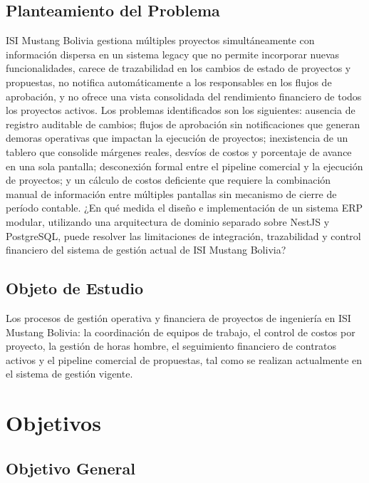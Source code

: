 \documentclass{univalle-perfil}
\begin{document}
\subsection{Planteamiento del Problema}

ISI Mustang Bolivia gestiona múltiples proyectos simultáneamente con información dispersa en un sistema legacy que no permite incorporar nuevas funcionalidades, carece de trazabilidad en los cambios de estado de proyectos y propuestas, no notifica automáticamente a los responsables en los flujos de aprobación, y no ofrece una vista consolidada del rendimiento financiero de todos los proyectos activos. Los problemas identificados son los siguientes: ausencia de registro auditable de cambios; flujos de aprobación sin notificaciones que generan demoras operativas que impactan la ejecución de proyectos; inexistencia de un tablero que consolide márgenes reales, desvíos de costos y porcentaje de avance en una sola pantalla; desconexión formal entre el pipeline comercial y la ejecución de proyectos; y un cálculo de costos deficiente que requiere la combinación manual de información entre múltiples pantallas sin mecanismo de cierre de período contable. ¿En qué medida el diseño e implementación de un sistema ERP modular, utilizando una arquitectura de dominio separado sobre NestJS y PostgreSQL, puede resolver las limitaciones de integración, trazabilidad y control financiero del sistema de gestión actual de ISI Mustang Bolivia?

\subsection{Objeto de Estudio}

Los procesos de gestión operativa y financiera de proyectos de ingeniería en ISI Mustang Bolivia: la coordinación de equipos de trabajo, el control de costos por proyecto, la gestión de horas hombre, el seguimiento financiero de contratos activos y el pipeline comercial de propuestas, tal como se realizan actualmente en el sistema de gestión vigente.

\section{Objetivos}

\subsection{Objetivo General}
\end{document}
